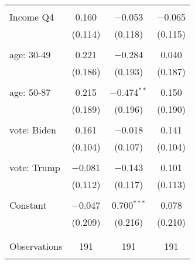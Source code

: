\begin{tabular}{@{\extracolsep{5pt}}lccc}
  & & & \\ 
 Income Q4 & 0.160 & $-$0.053 & $-$0.065 \\ 
  & (0.114) & (0.118) & (0.115) \\ 
  & & & \\ 
 age: 30-49 & 0.221 & $-$0.284 & 0.040 \\ 
  & (0.186) & (0.193) & (0.187) \\ 
  & & & \\ 
 age: 50-87 & 0.215 & $-$0.474$^{**}$ & 0.150 \\ 
  & (0.189) & (0.196) & (0.190) \\ 
  & & & \\ 
 vote: Biden & 0.161 & $-$0.018 & 0.141 \\ 
  & (0.104) & (0.107) & (0.104) \\ 
  & & & \\ 
 vote: Trump & $-$0.081 & $-$0.143 & 0.101 \\ 
  & (0.112) & (0.117) & (0.113) \\ 
  & & & \\ 
 Constant & $-$0.047 & 0.700$^{***}$ & 0.078 \\ 
  & (0.209) & (0.216) & (0.210) \\ 
  & & & \\ 
\hline \\[-1.8ex] 

Observations & 191 & 191 & 191 \\ 
\hline 
\hline \\[-1.8ex] 
\end{tabular} 